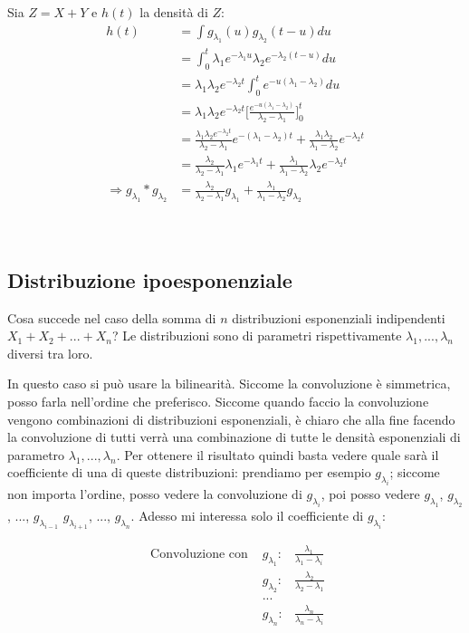\documentclass[a4paper,12pt]{book}
\begin{document}
Sia $ Z = X + Y $ e $ h(t) $ la densità di $ Z $:
\begin{align*}
	h(t) & = \int g_{\lambda_1}(u) g_{\lambda_2}(t-u) du \\ 
	& = \int_{0}^{t} \lambda_1e^{-\lambda_1 u} \lambda_2e^{-\lambda_2(t-u)} du \\
	& = \lambda_1\lambda_2e^{-\lambda_2 t} \int_{0}^{t}e^{-u(\lambda_1-\lambda_2)} du \\
	& = \lambda_1\lambda_2e^{-\lambda_2 t} \bigg[\frac{e^{-u(\lambda_1-\lambda_2)}}{\lambda_2 - 
		\lambda_1}\bigg]^{t}_0 \\
	& = \frac{\lambda_1\lambda_2 e^{-\lambda_2 t}}{\lambda_2 - \lambda_1}e^{-(\lambda_1 - \lambda_2)t} + \frac{\lambda_1\lambda_2}{\lambda_1-\lambda_2}e^{-\lambda_2 t} \\
	& = \frac{\lambda_2}{\lambda_2 - \lambda_1} \lambda_1 e^{-\lambda_1 t} + \frac{\lambda_1}{\lambda_1 - \lambda_2}\lambda_2 e^{-\lambda_2t} \\
	\Rightarrow g_{\lambda_1} * g_{\lambda_2} & = \frac{\lambda_2}{\lambda_2 - \lambda_1} g_{\lambda_1} + \frac{\lambda_1}{\lambda_1-\lambda_2}g_{\lambda_2} 
\end{align*}
\\
\\
\subsection{Distribuzione ipoesponenziale}
Cosa succede nel caso della somma di $ n $ distribuzioni esponenziali indipendenti $ X_1 + X_2 + ... + X_n $? Le distribuzioni sono di parametri rispettivamente $ \lambda_1, ..., \lambda_n $ diversi tra loro. 

In questo caso si può usare la bilinearità. Siccome la convoluzione è simmetrica, posso farla nell'ordine che preferisco. Siccome quando faccio la convoluzione vengono combinazioni di distribuzioni esponenziali, è chiaro che alla fine facendo la convoluzione di tutti verrà una combinazione di tutte le densità esponenziali di parametro $\lambda_{1}, ..., \lambda_{n}$. Per ottenere il risultato quindi basta vedere quale sarà il coefficiente di una di queste distribuzioni: prendiamo per esempio $g_{\lambda_i}$; siccome non importa l'ordine, posso vedere la convoluzione di $g_{\lambda_i}$, poi posso vedere $g_{\lambda_1}$, $g_{\lambda_2}$, ..., $g_{\lambda_{i-1}}$ $g_{\lambda_{i+1}}$, ..., $g_{\lambda_n}$. Adesso mi interessa solo il coefficiente di $g_{\lambda_i}$:

$$ \begin{array}{ccc} 
 \text{ Convoluzione con } & g_{\lambda_1}: & \frac{\lambda_1}{\lambda_1 - \lambda_i} \\
 & g_{\lambda_2} : & \frac{\lambda_2}{\lambda_2  - \lambda_1} \\
 & ... & \\
 & g_{\lambda_n}: & \frac{\lambda_n}{\lambda_n - \lambda_i}
\end{array}$$
\end{document}
